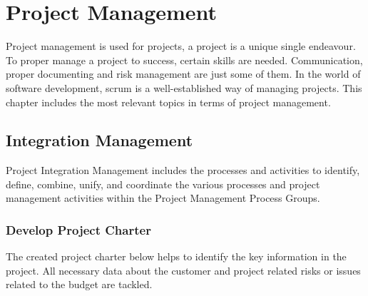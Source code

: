 \section{Project Management}
\label{sec:project_management}

Project management is used for projects, a project is a unique single endeavour. To proper manage a project to success, certain skills are needed. Communication, proper documenting and risk management are just some of them. In the world of software development, scrum is a well-established way of managing projects. This chapter includes the most relevant topics in terms of project management.





\subsection{Integration Management}
\label{ssec:integration_management}

Project Integration Management includes the processes and activities to identify, define, combine, unify, and
coordinate the various processes and project management activities within the Project Management Process
Groups.
\newpage

\subsubsection{Develop Project Charter}
\label{sssec:develop_project_charter}

The created project charter below helps to identify the key information in the project.
All necessary data about the customer and project related risks or issues related to the budget are tackled.

